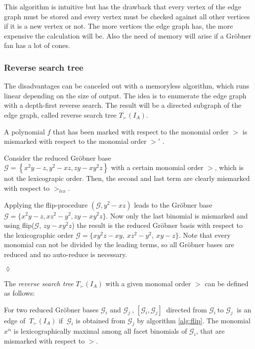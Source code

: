This algorithm is intuitive but has the drawback that every vertex of the edge graph must be stored and every vertex must be checked against all other vertices if it is a new vertex or not. 
The more vertices the edge graph has, the more expensive the calculation will be. Also the need of memory will arise if a Gröbner fan has a lot of cones.
 
 \newpage

\subsubsection{Reverse search tree}
The disadvantages can be canceled out with a memoryless algorithm, which runs linear depending on the size of output. The idea is to enumerate the edge graph with a depth-first reverse search. The result will be a directed subgraph of the edge graph, called reverse search tree $T_{\succ}(I_{A}) $.\\
\begin{env_definition}
\cite{tigers}
A polynomial $f$ that has been marked with respect to the monomial order $>$  is mismarked with respect to the monomial order $>'$  .
\end{env_definition}

\begin{env_example}\normalfont
Consider the reduced Gröbner base \\ $\mathcal{G} = \left\lbrace x^{2}y-z,y^{2}-xz, zy-xy^{2}z \right\rbrace $ 
with a certain monomial order $>$, which is not the lexicograpic order.
Then, the second and last term are clearly mismarked with respect to $>_{lex}$.

Applying the flip-procedure $(\mathcal{G},y^{2}-xz)$ leads to the Gröbner base \\ $\mathcal{G} = \{x^{2}y-z,xz^{2}-y^{2}, zy-xy^{2}z \} $. Now only the last binomial is mismarked and using flip($\mathcal{G}$, $zy-xy^{2}z$) the result is the reduced Gröbner basis with respect to the lexicographic order $\mathcal{G} = \{xy^{2}z -xy,~xz^{2}-y^{2},~xy-z \} $. Note that every monomial can not be divided by the leading terms, so all Gröbner bases are reduced and no auto-reduce is necessary.
 
\begin{flushright}
$\lozenge$
\end{flushright} 
\end{env_example}


The \textit{reverse search tree} $T_{\succ}(I_{A}) $ with a given monomal order $ > $ can be defined as follows:
\begin{env_definition}
\label{def:reverse}
\cite{tigers} For two reduced Gröbner bases $\mathcal{G}_{i}$ and $\mathcal{G}_{j}~$, $[\mathcal{G}_{i},\mathcal{G}_{j} ]~$ directed from $\mathcal{G}_{i}~$to $\mathcal{G}_{j}~$ is an edge of $~T_{\succ}(I_{A}) $ if $~\mathcal{G}_{i}$ is obtained from $\mathcal{G}_{j}$ by  algorithm \ref{alg:flip}. The monomial $x^{\upalpha}$ is lexicographically maximal among all facet binomials of $\mathcal{G}_{i}$, that are mismarked with respect to $>$.
\end{env_definition}


